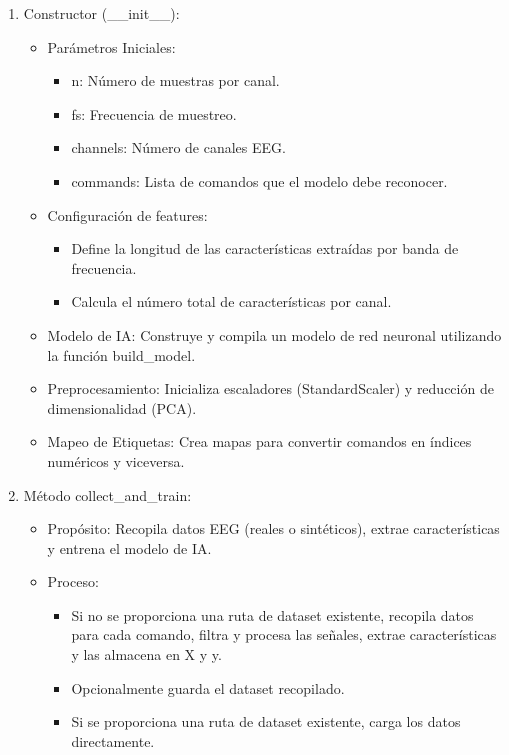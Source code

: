 \documentclass{article}
\begin{document}
\begin{enumerate}
    \item Constructor (\_\_init\_\_):
    \begin{itemize}
        \item Parámetros Iniciales:
        \begin{itemize}
            \item n: Número de muestras por canal.
            \item fs: Frecuencia de muestreo.
            \item channels: Número de canales EEG.
            \item commands: Lista de comandos que el modelo debe reconocer.
        \end{itemize}
        \item Configuración de features:
        \begin{itemize}
            \item Define la longitud de las características extraídas por banda de frecuencia.
            \item Calcula el número total de características por canal.
        \end{itemize}
        \item Modelo de IA: Construye y compila un modelo de red neuronal utilizando la función build\_model.
        \item Preprocesamiento: Inicializa escaladores (StandardScaler) y reducción de dimensionalidad (PCA).
        \item Mapeo de Etiquetas: Crea mapas para convertir comandos en índices numéricos y viceversa.
    \end{itemize}
    \item Método collect\_and\_train:
    \begin{itemize}
        \item Propósito: Recopila datos EEG (reales o sintéticos), extrae características y entrena el modelo de IA.
        \item Proceso:
        \begin{itemize}
            \item Si no se proporciona una ruta de dataset existente, recopila datos para cada comando, filtra y procesa las señales, extrae características y las almacena en X y y.
            \item Opcionalmente guarda el dataset recopilado.
            \item Si se proporciona una ruta de dataset existente, carga los datos directamente.

\end{itemize}
\end{itemize}
\end{enumerate}
\end{document}
